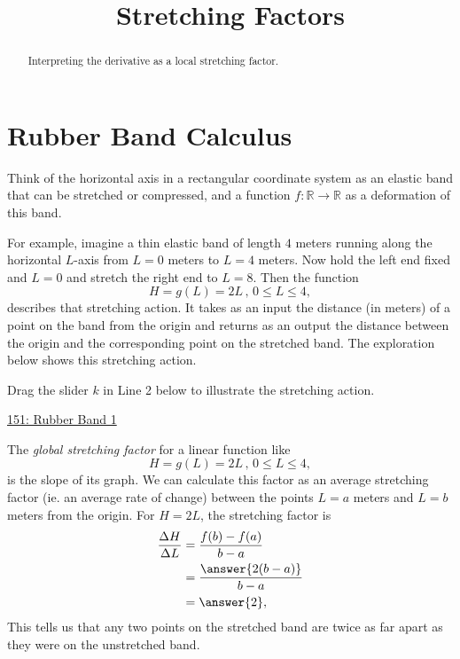 \documentclass{ximera}
\title{Stretching Factors}
\begin{document}
\begin{abstract}
Interpreting the derivative as a local stretching factor.
\end{abstract}
\maketitle

\section{Rubber Band Calculus}

Think of the horizontal axis in a rectangular coordinate system as an elastic band that can be stretched or compressed, and a function $f : \mathbb{R}\to\mathbb{R}$ as a deformation of this band. %

For example, imagine a thin elastic band of length $4$ meters running along the horizontal $L$-axis from $L=0$ meters to $L=4$ meters.  Now hold the left end fixed and $L=0$ and stretch the right end to $L=8$. Then the function
\[
      H = g(L) = 2L \, , \, 0\leq L \leq 4 ,
\]
describes that stretching action. It takes as an input the distance (in meters) of a point on the band from the origin and returns as an output the distance between the origin and the corresponding point on the stretched band. The exploration below shows this stretching action.

\begin{exploration} \label{Ex:98f3rgafgbb}
Drag the slider $k$ in Line 2 below to illustrate the stretching action.

\begin{onlineOnly}
    \begin{center}
\end{center}
\end{onlineOnly}

\href{https://www.desmos.com/calculator/qejivz36ui}{151: Rubber Band 1}

\end{exploration}

The \emph{global stretching factor} for a linear function like %
\[
      H = g(L) = 2L \, , \, 0\leq L \leq 4 ,
\]
is the slope of its graph. We can calculate this factor as an average stretching factor (ie. an average rate of change) between the points $L=a$  meters and $L=b$ meters from the origin. For $H=2L$, the stretching factor is
\begin{align*}
  \frac{\Delta H}{\Delta L} &= \frac{f(b) - f(a)}{b-a} \\
                                       &= \frac{\answer{2(b-a)}}{b-a} \\
                                       &= \answer{2},
\end{align*}
This tells us that any two points on the stretched band are twice as far apart as they were on the unstretched band.
\end{document}

